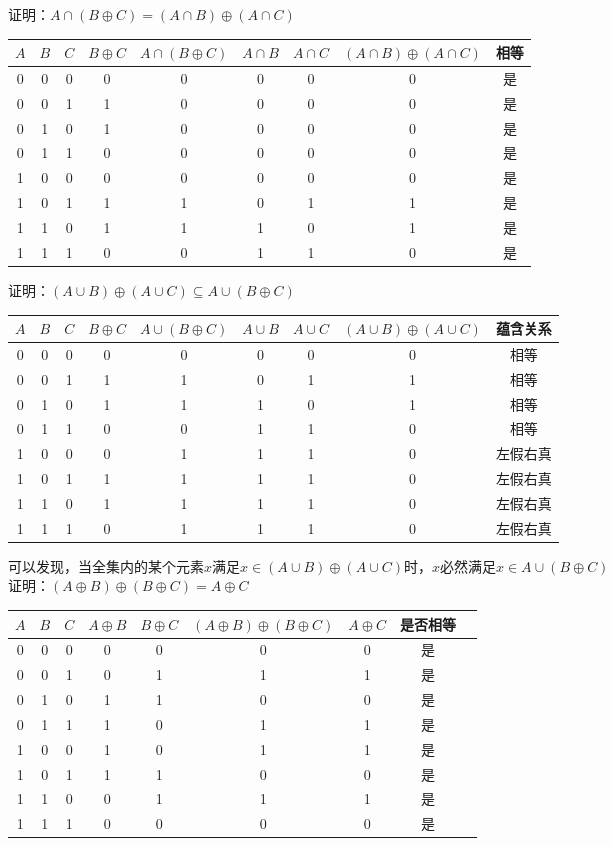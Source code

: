 \documentclass[lang=cn,11pt]{elegantbook}
\begin{document}
证明：$A \cap (B \oplus C) = (A \cap B) \oplus (A \cap C)$
\begin{center}
\begin{tabular}{ccc|cccccc}
$A$ & $B$ & $C$ & $B \oplus C$ & $A \cap (B \oplus C)$ & $A \cap B$ & $A \cap C$ & $(A \cap B) \oplus (A \cap C)$ & 相等 \\
\hline
0 & 0 & 0 & 0 & 0 & 0 & 0 & 0 & 是 \\
0 & 0 & 1 & 1 & 0 & 0 & 0 & 0 & 是 \\
0 & 1 & 0 & 1 & 0 & 0 & 0 & 0 & 是 \\
0 & 1 & 1 & 0 & 0 & 0 & 0 & 0 & 是 \\
1 & 0 & 0 & 0 & 0 & 0 & 0 & 0 & 是 \\
1 & 0 & 1 & 1 & 1 & 0 & 1 & 1 & 是 \\
1 & 1 & 0 & 1 & 1 & 1 & 0 & 1 & 是 \\
1 & 1 & 1 & 0 & 0 & 1 & 1 & 0 & 是 \\
\end{tabular}
\end{center}
证明：$(A\cup B)\oplus(A\cup C)\subseteq A\cup(B\oplus C)$
\begin{center}
\begin{tabular}{ccc|cccccc}
$A$ & $B$ & $C$ & $B \oplus C$ & $A \cup (B \oplus C)$ & $A \cup B$ & $A \cup C$ & $(A \cup B) \oplus (A \cup C)$ & 蕴含关系 \\
\hline
0 & 0 & 0 & 0 & 0 & 0 & 0 & 0 & 相等 \\
0 & 0 & 1 & 1 & 1 & 0 & 1 & 1 & 相等 \\
0 & 1 & 0 & 1 & 1 & 1 & 0 & 1 & 相等 \\
0 & 1 & 1 & 0 & 0 & 1 & 1 & 0 & 相等 \\
1 & 0 & 0 & 0 & 1 & 1 & 1 & 0 & 左假右真 \\
1 & 0 & 1 & 1 & 1 & 1 & 1 & 0 & 左假右真 \\
1 & 1 & 0 & 1 & 1 & 1 & 1 & 0 & 左假右真 \\
1 & 1 & 1 & 0 & 1 & 1 & 1 & 0 & 左假右真 \\
\end{tabular}
\end{center}
可以发现，当全集内的某个元素$x$满足$x\in (A \cup B) \oplus (A \cup C)$时，$x$必然满足$x\in A\cup(B\oplus C)$\\
证明：$(A \oplus B) \oplus (B \oplus C) = A \oplus C$
\begin{center}
\begin{tabular}{ccc|cccccc}
$A$ & $B$ & $C$ & $A \oplus B$ & $B \oplus C$ & $(A \oplus B) \oplus (B \oplus C)$ & $A \oplus C$ & 是否相等 \\
\hline
0 & 0 & 0 & 0 & 0 & 0 & 0 & 是 \\
0 & 0 & 1 & 0 & 1 & 1 & 1 & 是 \\
0 & 1 & 0 & 1 & 1 & 0 & 0 & 是 \\
0 & 1 & 1 & 1 & 0 & 1 & 1 & 是 \\
1 & 0 & 0 & 1 & 0 & 1 & 1 & 是 \\
1 & 0 & 1 & 1 & 1 & 0 & 0 & 是 \\
1 & 1 & 0 & 0 & 1 & 1 & 1 & 是 \\
1 & 1 & 1 & 0 & 0 & 0 & 0 & 是 \\
\end{tabular}
\end{center}
\end{document}
